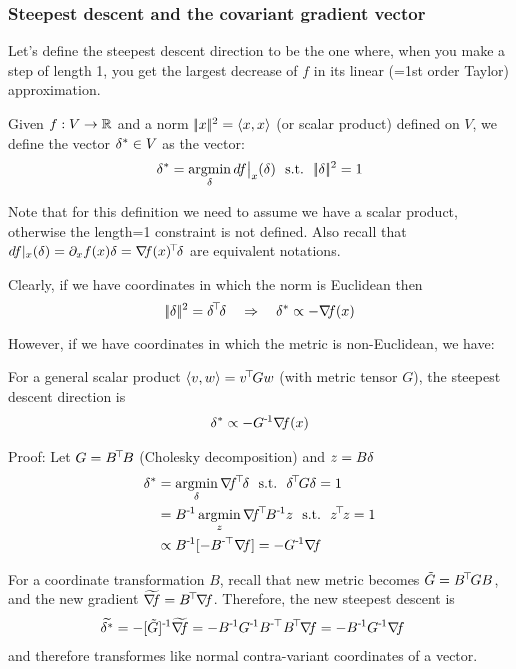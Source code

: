 \subsubsection{Steepest descent and the covariant gradient vector}

Let's define the steepest descent direction to be the one where, when you
make a step of length 1, you get the largest decrease of $f$ in its
linear (=1st order Taylor) approximation.

\begin{myDefinition}
Given $f:V \to {\mathbb{R}}$ and a norm $|\!|x|\!|^2=\langle x,x\rangle$ (or scalar product)
defined on $V$, we define the  vector
$\delta^*\in V$ as the vector:
\begin{align}
\delta^* = \operatorname*{argmin}_\delta df\big|_x(\delta) ~~\text{s.t.}~~ |\!|\delta|\!|^2=1
\end{align}
\end{myDefinition}
Note that for this definition we need to assume we have a scalar product, otherwise the length=1 constraint is not defined. Also recall that $df|_x(\delta) = \partial_x f(x) \delta = {\nabla_{\!\!}} f(x) ^{\!\top\!} \delta$ are equivalent notations.

Clearly, if we have coordinates in which the norm is Euclidean then
\begin{equation}
|\!|\delta|\!|^2 = \delta^{\!\top\!} \delta \quad\Rightarrow\quad \delta^* \propto - {\nabla_{\!\!}} f(x)
\end{equation}

However, if we have coordinates in which the metric is non-Euclidean,
we have:
\begin{myTheorem}
For a general scalar product $\langle v,w\rangle = v^{\!\top\!} G w$ (with metric tensor
$G$), the steepest descent direction is
\begin{align}
\delta^* \propto - G^{{\hspace*{-.0pt}\text{\rm -}\hspace*{-.5pt}}1} {\nabla_{\!\!}} f(x)
\end{align}
\end{myTheorem}
Proof: Let $G = B^{\!\top\!} B$ (Cholesky decomposition) and $z = B \delta$
\begin{align}
\d^*
&= \argmin_\d \na f^\T \d \st \d^\T G \d=1 \\
&= B^\1 \argmin_z \na f^\T B^\1 z \st z^\T z = 1\\
&\propto B^\1 [- B^\mT \na f] = - G^\1 \na f
\end{align}

For a coordinate transformation $B$, recall that new metric becomes $\tilde G = B^{\!\top\!} G B$, and the new gradient $\widetilde{{\nabla_{\!\!}} f} = B^{\!\top\!} {\nabla_{\!\!}} f$. Therefore, the new steepest descent is
  \begin{align}
    \widetilde{\d^*}
    &= - [\tilde G]^\1 \widetilde{\na f}
    = - B^\1 G^\1 B^\mT B^\T \na f = -B^\1 G^\1 \na f
    \end{align}
  and therefore transformes like normal contra-variant coordinates of a vector.
  

